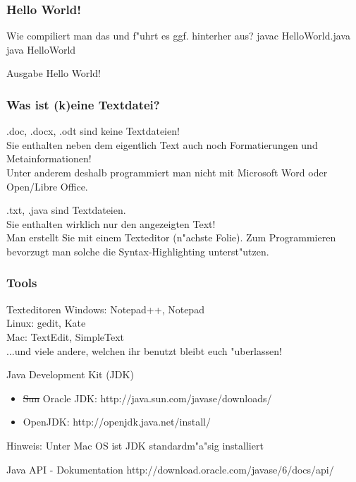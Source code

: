 \documentclass{beamer}
\begin{document}
\begin{frame}
\frametitle{Hello World!}

\pause
\begin{block}{Wie compiliert man das und f"uhrt es ggf. hinterher aus?}
\pause
javac HelloWorld.java\pause\\
java HelloWorld
\end{block}
\pause
\begin{block}{Ausgabe}
Hello World!
\end{block}
\end{frame}


\begin{frame}
\frametitle{Was ist (k)eine Textdatei?}
\begin{block}{.doc, .docx, .odt}
\pause
sind \alert{keine} Textdateien!\\
Sie enthalten neben dem eigentlich Text auch noch Formatierungen und Metainformationen!\\
Unter anderem deshalb programmiert man \alert{nicht} mit Microsoft Word oder Open/Libre Office.
\end{block}

\pause

\begin{block}{.txt, .java}
sind Textdateien.\\
Sie enthalten wirklich nur den angezeigten Text!\\
Man erstellt Sie mit einem Texteditor (n"achste Folie). Zum Programmieren bevorzugt man solche die Syntax-Highlighting unterst"utzen.
\end{block}
\end{frame}

\begin{frame}
\frametitle{Tools}
\begin{block}{Texteditoren}
Windows: Notepad++, Notepad\\
Linux: gedit, Kate\\
Mac: TextEdit, SimpleText\\
...und viele andere, welchen ihr benutzt bleibt euch "uberlassen!
\end{block}

\begin{block}{Java Development Kit (JDK)}
\begin{itemize}
\item \sout{Sun} Oracle JDK: http://java.sun.com/javase/downloads/
\item OpenJDK: http://openjdk.java.net/install/
\end{itemize}
Hinweis: Unter Mac OS ist JDK standardm"a"sig installiert
\end{block}

\begin{block}{Java API - Dokumentation}
http://download.oracle.com/javase/6/docs/api/
\end{block}
\end{frame}
\end{document}
